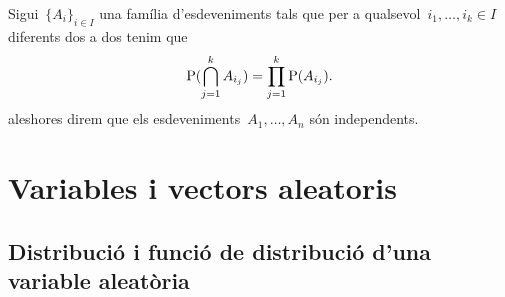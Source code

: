 \documentclass[../../main.tex]{subfiles}
\begin{document}
    \begin{definition}
        \label{def:esdeveniments independents cas general}
        Sigui~\(\{A_{i}\}_{i\in I}\) una família d'esdeveniments tals que per a qualsevol~\(i_{1},\dots,i_{k}\in I\) diferents dos a dos tenim que
        \[
            \mathrm{P}(\bigcap_{j=1}^{k}A_{i_{j}})=\prod_{j=1}^{k}\mathrm{P}(A_{i_{j}}).
        \]
        aleshores direm que els esdeveniments~\(A_{1},\dots,A_{n}\) són independents.
    \end{definition}
\chapter{Variables i vectors aleatoris}
\section{Distribució i funció de distribució d'una variable aleatòria}
\end{document}
